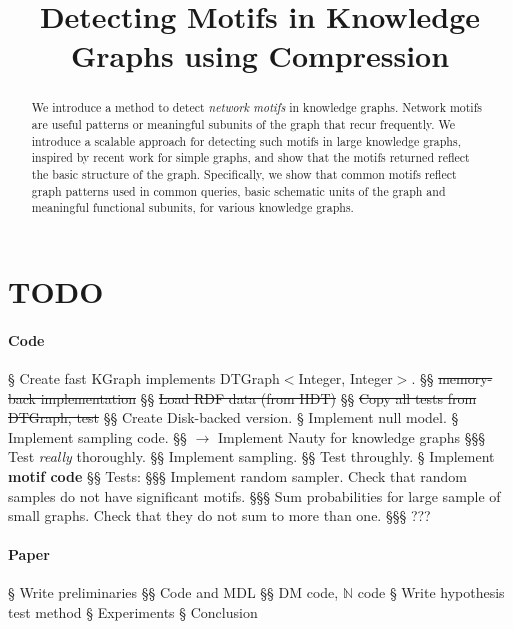 \documentclass[11pt]{article}
\title{Detecting Motifs in Knowledge Graphs using Compression}
\newcommand{\N}{{\mathbb N}}
\begin{document}
\section{TODO}

\paragraph{Code}

\begin{easylist}[itemize]
§ Create fast KGraph implements DTGraph$<$Integer, Integer$>$.
§§ \st{memory-back implementation}
§§ \st{Load RDF data (from HDT)}
§§ \st{Copy all tests from DTGraph, test}
§§ Create Disk-backed version.
§ Implement null model.
§ Implement sampling code. 
§§ $\to$ Implement Nauty for knowledge graphs
§§§ Test \emph{really} thoroughly.
§§ Implement sampling.
§§ Test throughly. 
§ Implement \textbf{motif code}
§§ Tests:
§§§ Implement random sampler. Check that random samples do not have significant motifs.
§§§ Sum probabilities for large sample of small graphs. Check that they do not sum to more than one.
§§§ ???
\end{easylist}

\paragraph{Paper}

\begin{easylist}[itemize]
§ Write preliminaries
§§ Code and MDL
§§ DM code, $\N$ code
§ Write hypothesis test method
§ Experiments
§ Conclusion
\end{easylist}

\maketitle

\begin{abstract}
\noindent We introduce a method to detect \emph{network motifs} in knowledge graphs. Network motifs are useful patterns or meaningful subunits of the graph that recur frequently. We introduce a scalable approach for detecting such motifs in large knowledge graphs, inspired by recent work for simple graphs, and show that the motifs returned reflect the basic structure of the graph. Specifically, we show that common motifs reflect graph patterns used in common queries, basic schematic units of the graph and meaningful functional subunits, for various knowledge graphs.
\end{abstract}
\end{document}
